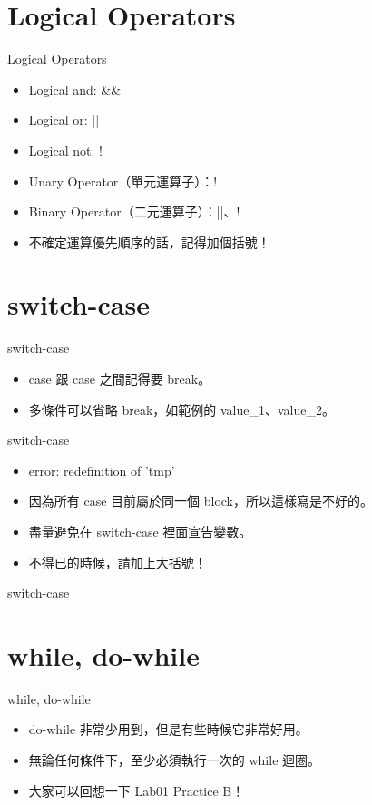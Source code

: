 \documentclass[t]{beamer}
\begin{document}
\section{Logical Operators}
\begin{frame}{Logical Operators}
  \begin{itemize}
    \item Logical and: \&\&
    \item Logical or: ||
    \item Logical not: !
    \item Unary Operator（單元運算子）：!
    \item Binary Operator（二元運算子）：||、!
    \item 不確定運算優先順序的話，記得加個括號！
  \end{itemize}
\end{frame}

\section{switch-case}
\begin{frame}{switch-case}
  
  \begin{itemize}
    \item case 跟 case 之間記得要 break。
    \item 多條件可以省略 break，如範例的 value\_1、value\_2。
  \end{itemize}
\end{frame}

\begin{frame}{switch-case}
  
  \begin{itemize}
    \item error: redefinition of 'tmp'
    \item 因為所有 case 目前屬於同一個 block，所以這樣寫是不好的。
    \item 盡量避免在 switch-case 裡面宣告變數。
    \item 不得已的時候，請加上大括號！
  \end{itemize}
\end{frame}

\begin{frame}{switch-case}
  
\end{frame}

\section{while, do-while}
\begin{frame}{while, do-while}
  \begin{itemize}
    \item do-while 非常少用到，但是有些時候它非常好用。
    \item 無論任何條件下，至少必須執行一次的 while 迴圈。
    \item 大家可以回想一下 Lab01 Practice B！
  \end{itemize}
\end{frame}
\end{document}
